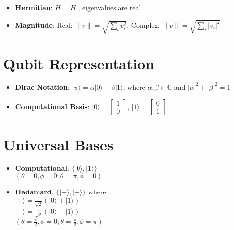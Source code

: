 \begin{multicols}{3}
\begin{itemize}[leftmargin=*,nosep,topsep=0pt]
    \item \textbf{Hermitian}: $H = H^\dagger$, eigenvalues are real

    \item \textbf{Magnitude}: Real: $\|v\| = \sqrt{\sum_i v_i^2}$, Complex:
      $\|v\| = \sqrt{\sum_i |v_i|^2}$

  \end{itemize}


  \section*{Qubit Representation}
  \begin{itemize}[leftmargin=*,nosep,topsep=0pt]
    \item \textbf{Dirac Notation}: $|\psi\rangle = \alpha|0\rangle +
      \beta|1\rangle$, where $\alpha,\beta \in \mathbb{C}$ and $|\alpha|^2 +
      |\beta|^2 = 1$

    \item \textbf{Computational Basis}: $|0\rangle = \begin{bmatrix} 1 \\ 0
        \end{bmatrix}$, $|1\rangle = \begin{bmatrix} 0 \\ 1 \end{bmatrix}$
    \end{itemize}

    \section*{Universal Bases}
    \begin{itemize}[leftmargin=*,nosep,topsep=0pt]
      \item \textbf{Computational}: $\{|0\rangle, |1\rangle\}$ \\
        $(\theta=0, \phi=0; \theta=\pi, \phi=0)$

      \item \textbf{Hadamard}: $\{|+\rangle, |-\rangle\}$ where\\
        $|+\rangle = \frac{1}{\sqrt{2}}(|0\rangle + |1\rangle)$\\
        $|-\rangle = \frac{1}{\sqrt{2}}(|0\rangle - |1\rangle)$\\
        $(\theta=\frac{\pi}{2}, \phi=0; \theta=\frac{\pi}{2}, \phi=\pi)$


\end{itemize}
\end{multicols}
